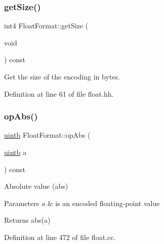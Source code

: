 \mbox{\label{class_float_format_ad8a88c53da2b55aae1c707a33a53c501}} 
\subsubsection{\texorpdfstring{getSize()}{getSize()}}
{\footnotesize\ttfamily int4 Float\+Format\+::get\+Size (\begin{DoxyParamCaption}\item[{void}]{ }\end{DoxyParamCaption}) const\hspace{0.3cm}{\ttfamily [inline]}}



Get the size of the encoding in bytes. 



Definition at line 61 of file float.\+hh.

\mbox{\label{class_float_format_a5edfc9c055efded2f22bb42a91058164}} 
\subsubsection{\texorpdfstring{opAbs()}{opAbs()}}
{\footnotesize\ttfamily \mbox{\hyperlink{types_8h_a2db313c5d32a12b01d26ac9b3bca178f}{uintb}} Float\+Format\+::op\+Abs (\begin{DoxyParamCaption}\item[{\mbox{\hyperlink{types_8h_a2db313c5d32a12b01d26ac9b3bca178f}{uintb}}}]{a }\end{DoxyParamCaption}) const}



Absolute value (abs) 


\begin{DoxyParams}{Parameters}
{\em a} & is an encoded floating-\/point value \\
\hline
\end{DoxyParams}
\begin{DoxyReturn}{Returns}
abs(a) 
\end{DoxyReturn}


Definition at line 472 of file float.\+cc.

